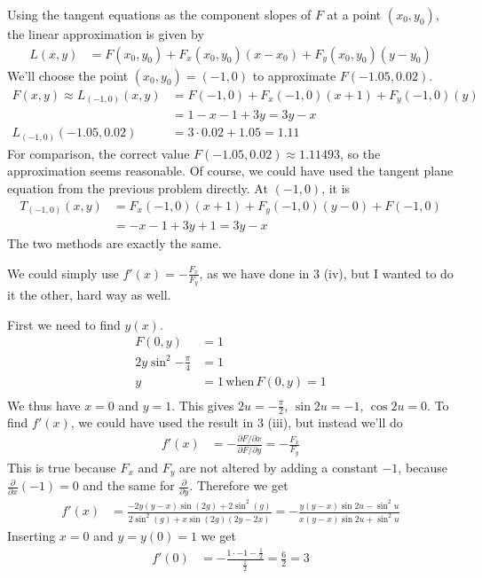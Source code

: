 \documentclass[a4paper,norsk,12pt]{article}
\begin{document}
Using the tangent equations as the component slopes of $F$ at a point $(x_0,
y_0)$, the linear approximation is given by
\begin{align*}
  L(x,y) &= F(x_0, y_0) + F_x(x_0, y_0)(x-x_0) + F_y(x_0, y_0)(y-y_0)
\end{align*}
We'll choose the point $(x_0, y_0) = (-1, 0)$ to approximate $F(-1.05, 0.02)$.
\begin{align*}
  F(x,y) \approx
  L_{(-1,0)}(x,y)
    &= F(-1,0) + F_x(-1,0)(x+1) + F_y(-1,0)(y) \\
    &= 1 - x - 1 + 3y = 3y-x \\
  L_{(-1,0)}(-1.05, 0.02)
    &= 3\cdot0.02 + 1.05 = 1.11
\end{align*}
For comparison, the correct value $F(-1.05, 0.02) \approx 1.11493$, so the
approximation seems reasonable. Of course, we could have used the tangent plane
equation from the previous problem directly. At $(-1,0)$, it is
\begin{align*}
  T_{(-1,0)}(x,y)
    &= F_x(-1,0)(x+1) + F_y(-1,0)(y-0) + F(-1,0)\\
    &= -x-1 + 3y + 1 = 3y-x
\end{align*}
The two methods are exactly the same.

\clearpage
{}
We could simply use $f'(x) = -\frac{F_x}{F_y}$, as we have done in 3 (iv), but
I wanted to do it the other, hard way as well.



First we need to find $y(x)$.
\begin{align*}
  F(0,y) &= 1 \\
  2y\sin^2{-\frac{\pi}{4}} &= 1\\
  y &= 1 \,\text{when}\, F(0,y)=1\\
\end{align*}
We thus have $x=0$ and $y=1$. This gives $2u = -\frac{\pi}{2}$, $\sin{2u} =
-1$, $\cos{2u} = 0$. To find $f'(x)$, we could have used the result in 3 (iii),
but instead we'll do
\begin{align*}
  f'(x) &= -\frac{\partial F / \partial x}{\partial F / \partial y}
  = -\frac{F_x}{F_y}
\end{align*}
This is true because $F_x$ and $F_y$ are not altered by adding a constant $-1$,
because $\frac{\partial}{\partial x}\left(-1\right) = 0$ and the same for
$\frac{\partial}{\partial y}$. Therefore we get
\begin{align*}
  f'(x) &= \frac{-2y(y-x)\sin{(2g)}+2\sin^2{(g)}}
                {2\sin^2{(g)}+x\sin{(2g)}(2y-2x)}
      = -\frac{y(y-x)\sin{2u} - \sin^2{u}}
              {x(y-x)\sin{2u} + \sin^2{u}}
\end{align*}
Inserting $x=0$ and $y=y(0)=1$ we get
\begin{align*}
  f'(0) &= -\frac{1\cdot-1 - \frac{1}{2}}{\frac{1}{2}} = \frac{6}{2} = 3
\end{align*}
\end{document}
